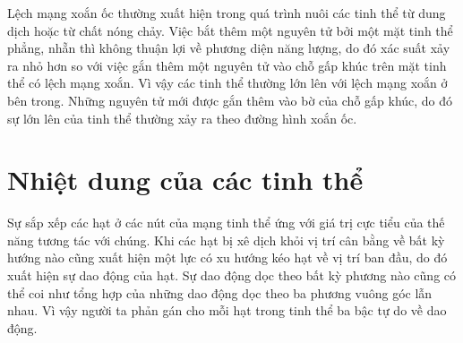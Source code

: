 
Lệch mạng xoắn ốc thường xuất hiện trong quá trình nuôi các tinh thể từ dung dịch hoặc từ chất nóng chảy. Việc bắt thêm một nguyên tử bởi một mặt tinh thể phẳng, nhẵn thì không thuận lợi về phương diện năng lượng, do đó xác suất xảy ra nhỏ hơn so với việc gắn thêm một nguyên tử vào chỗ gấp khúc trên mặt tinh thể có lệch mạng xoắn. Vì vậy các tinh thể thường lớn lên với lệch mạng xoắn ở bên trong. Những nguyên tử mới được gắn thêm vào bờ của chỗ gấp khúc, do đó sự lớn lên của tinh thể thường xảy ra theo đường hình xoắn ốc.


\section{Nhiệt dung của các tinh thể}\label{sec:13_5}


Sự sắp xếp các hạt ở các nút của mạng tinh thể ứng với giá trị cực tiểu của thế năng tương tác với chúng. Khi các hạt bị xê dịch khỏi vị trí cân bằng về bất kỳ hướng nào cũng xuất hiện một lực có xu hướng kéo hạt về vị trí ban đầu, do đó xuất hiện sự dao động của hạt. Sự dao động dọc theo bất kỳ phương nào cũng có thể coi như tổng hợp của những dao động dọc theo ba phương vuông góc lẫn nhau. Vì vậy người ta phản gán cho mỗi hạt trong tinh thể ba bậc tự do về dao động.

